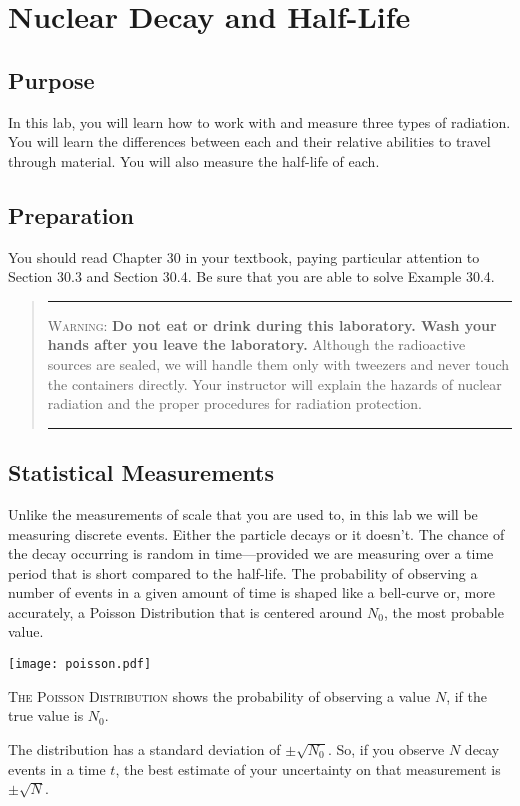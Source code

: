 
\chapter {Nuclear Decay and Half-Life}

\section {Purpose} In this lab, you will learn how to work with and measure three types of radiation.  You will learn the differences between each and their relative abilities to travel through material.  You will also measure the half-life of each.

\section {Preparation}  You should read Chapter 30 in your textbook, paying particular attention to Section 30.3 and Section 30.4.  Be sure that you are able to solve Example 30.4.  

\begin{quote}\hrule
\textsc{Warning}:  \textbf{Do not eat or drink during this laboratory. Wash your hands after you leave the laboratory.} Although the radioactive sources are sealed, we will handle them only with tweezers and never touch the containers directly. Your instructor will explain the hazards of nuclear radiation and the proper procedures for radiation protection.
\hrule
\end{quote}

\section {Statistical Measurements}  Unlike the measurements of scale that you are used to, in this lab we will be measuring discrete events.  Either the particle decays or it doesn't.  The chance of the decay occurring is random in time---provided we are measuring over a time period that is short compared to the half-life.  The probability of observing a number of events in a given amount of time is shaped like a bell-curve or, more accurately, a Poisson Distribution that is centered around $N_{0}$, the most probable value.

\begin{marginfigure}
	\texttt{[image: poisson.pdf]}
	\caption[Poisson Distribution]{\textsc{The Poisson Distribution} shows the probability of observing a value $N$, if the true value is $N_{0}$.}
\end{marginfigure}
The distribution has a standard deviation of $\pm\sqrt{N_{0}}$.  So, if you observe $N$ decay events in a time $t$, the best estimate of your uncertainty on that measurement is $\pm\sqrt{N}$.

